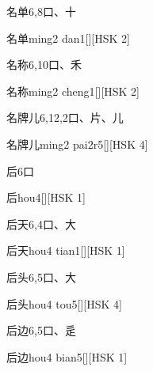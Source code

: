 \begin{entry}{名单}{6,8}{⼝、⼗}
  \begin{phonetics}{名单}{ming2 dan1}[][HSK 2]
  \end{phonetics}
\end{entry}

\begin{entry}{名称}{6,10}{⼝、⽲}
  \begin{phonetics}{名称}{ming2 cheng1}[][HSK 2]
  \end{phonetics}
\end{entry}

\begin{entry}{名牌儿}{6,12,2}{⼝、⽚、⼉}
  \begin{phonetics}{名牌儿}{ming2 pai2r5}[][HSK 4]
  \end{phonetics}
\end{entry}

\begin{entry}{后}{6}{⼝}
  \begin{phonetics}{后}{hou4}[][HSK 1]
  \end{phonetics}
\end{entry}

\begin{entry}{后天}{6,4}{⼝、⼤}
  \begin{phonetics}{后天}{hou4 tian1}[][HSK 1]
  \end{phonetics}
\end{entry}

\begin{entry}{后头}{6,5}{⼝、⼤}
  \begin{phonetics}{后头}{hou4 tou5}[][HSK 4]
  \end{phonetics}
\end{entry}

\begin{entry}{后边}{6,5}{⼝、⾡}
  \begin{phonetics}{后边}{hou4 bian5}[][HSK 1]
  \end{phonetics}
\end{entry}


